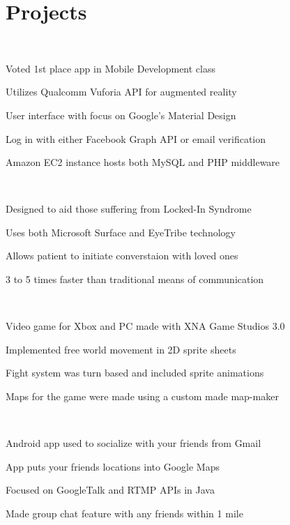 \documentclass[]{deedy-resume-openfont}
\begin{document}
\begin{minipage}[t]{0.66\textwidth}

\section{Projects}
\href{http://augmonted.github.io}{} \\
\begin{tightemize}
\item Voted 1st place app in Mobile Development class
\item Utilizes Qualcomm Vuforia API for augmented reality
\item User interface with focus on Google's Material Design
\item Log in with either Facebook Graph API or email verification
\item Amazon EC2 instance hosts both MySQL and PHP middleware
\end{tightemize}
\sectionsep

\href{https://www.youtube.com/watch?v=mYUiSeqqgDY&list=PLbbCsk7MUIGfXpnd9XN-pBeCd6ixuCQ2X}{} \\
\begin{tightemize}
\item Designed to aid those suffering from Locked-In Syndrome
\item Uses both Microsoft Surface and EyeTribe technology
\item Allows patient to initiate converstaion with loved ones
\item 3 to 5 times faster than traditional means of communication
\end{tightemize}
\sectionsep

\href{https://github.com/jonwho/ScottTheIntern}{} \\
\begin{tightemize}
\item Video game for Xbox and PC made with XNA Game Studios 3.0
\item Implemented free world movement in 2D sprite sheets
\item Fight system was turn based and included sprite animations
\item Maps for the game were made using a custom made map-maker
\end{tightemize}
\sectionsep

 \\
\begin{tightemize}
\item Android app used to socialize with your friends from Gmail
\item App puts your friends locations into Google Maps
\item Focused on GoogleTalk and RTMP APIs in Java
\item Made group chat feature with any friends within 1 mile
\end{tightemize}
\sectionsep

\end{minipage} 
\end{document}
